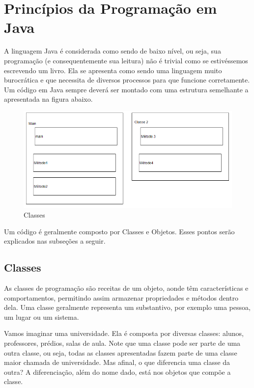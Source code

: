 \documentclass[
]{book}
\begin{document}
\hypertarget{princuxedpios-da-programauxe7uxe3o-em-java}{%
\chapter{Princípios da Programação em Java}\label{princuxedpios-da-programauxe7uxe3o-em-java}}

A linguagem Java é considerada como sendo de baixo nível, ou seja, sua programação (e consequentemente sua leitura) não é trivial como se estivéssemos escrevendo um livro. Ela se apresenta como sendo uma linguagem muito burocrática e que necessita de diversos processos para que funcione corretamente. Um código em Java sempre deverá ser montado com uma estrutura semelhante a apresentada na figura abaixo.

\begin{figure}
\centering
\includegraphics{imagens/imagem clases.png}
\caption{Classes}
\end{figure}

Um código é geralmente composto por Classes e Objetos. Esses pontos serão explicados nas subseções a seguir.

\hypertarget{classes}{%
\section{Classes}\label{classes}}

As classes de programação são receitas de um objeto, aonde têm características e comportamentos, permitindo assim armazenar propriedades e métodos dentro dela. Uma classe geralmente representa um substantivo, por exemplo uma pessoa, um lugar ou um sistema.

Vamos imaginar uma universidade. Ela é composta por diversas classes: alunos, professores, prédios, salas de aula. Note que uma classe pode ser parte de uma outra classe, ou seja, todas as classes apresentadas fazem parte de uma classe maior chamada de universidade. Mas afinal, o que diferencia uma classe da outra? A diferenciação, além do nome dado, está nos objetos que compõe a classe.
\end{document}
